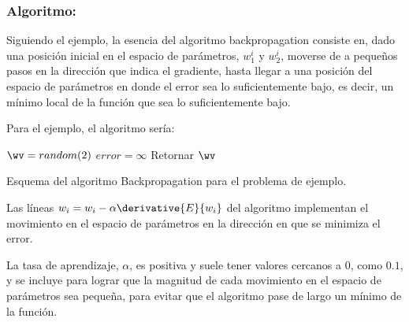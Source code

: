 
\subsubsection{Algoritmo:}

Siguiendo el ejemplo, la esencia del algoritmo backpropagation consiste en, dado una posición inicial en el espacio de parámetros, $w_1^i$ y $w_2^i$, moverse de a pequeños pasos en la dirección que indica el gradiente, hasta llegar a una posición del espacio de parámetros en donde el error sea lo suficientemente bajo, es decir, un mínimo local de la función que sea lo suficientemente bajo.


Para el ejemplo, el algoritmo sería:

\begin{algorithm}[H]
$\wv=random(2)$\;
$error=\infty$ \;
Retornar  $\wv$ \;
\caption{Esquema del algoritmo Backpropagation para el problema de ejemplo.} 
\end{algorithm}
\vspace{10pt}

Las líneas $w_i = w_i - \alpha \derivative{E}{w_i}$ del algoritmo implementan el movimiento en el espacio de parámetros en la dirección en que se minimiza el error.

La tasa de aprendizaje, $\alpha$, es positiva y suele tener valores cercanos a 0, como $0.1$, y se incluye para lograr que la magnitud de cada movimiento en el espacio de parámetros sea pequeña, para evitar que el algoritmo pase de largo un mínimo de la función.



